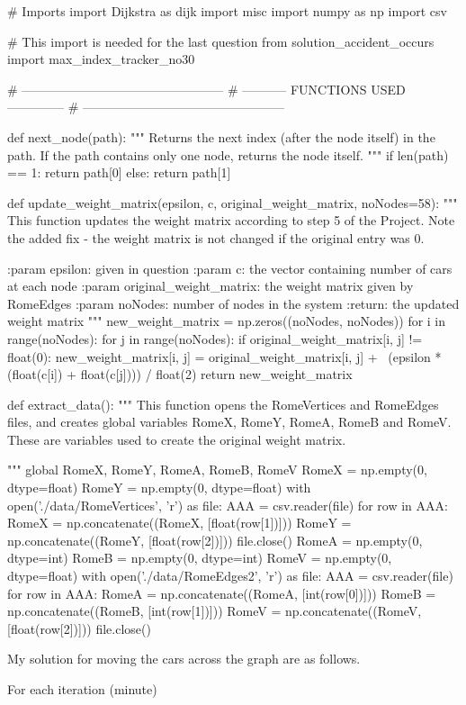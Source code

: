 \documentclass[paper=a4, fontsize=12pt]{scrartcl} %
\numberwithin{equation}{section}       %
\numberwithin{figure}{section}         %
\numberwithin{table}{section}          %
\begin{document}
\begin{python}
# Imports
import Dijkstra as dijk
import misc
import numpy as np
import csv

# This import is needed for the last question
from solution_accident_occurs import max_index_tracker_no30


# ------------------------------------------------
# -----------    FUNCTIONS USED     --------------
# ------------------------------------------------

def next_node(path):
    """ Returns the next index (after the node itself) in the path.
        If the path contains only one node, returns the node itself.
    """
    if len(path) == 1:
        return path[0]
    else:
        return path[1]


def update_weight_matrix(epsilon, c, original_weight_matrix, noNodes=58):
    """
    This function updates the weight matrix according to step 5 of the
    Project. Note the added fix - the weight matrix is not changed if
    the original entry was 0.



    :param epsilon: given in question
    :param c: the vector containing number of cars at each node
    :param original_weight_matrix: the weight matrix given by RomeEdges
    :param noNodes: number of nodes in the system
    :return: the updated weight matrix
    """
    new_weight_matrix = np.zeros((noNodes, noNodes))
    for i in range(noNodes):
        for j in range(noNodes):
            if original_weight_matrix[i, j] != float(0):
                new_weight_matrix[i, j] = original_weight_matrix[i, j] + \
                                          (epsilon * (float(c[i]) +
                                                      float(c[j]))) / float(2)
    return new_weight_matrix


def extract_data():
    """
    This function opens the RomeVertices and RomeEdges files, and creates
    global variables RomeX, RomeY, RomeA, RomeB and RomeV. These are variables
    used to create the original weight matrix.

    """
    global RomeX, RomeY, RomeA, RomeB, RomeV
    RomeX = np.empty(0, dtype=float)
    RomeY = np.empty(0, dtype=float)
    with open('./data/RomeVertices', 'r') as file:
        AAA = csv.reader(file)
        for row in AAA:
            RomeX = np.concatenate((RomeX, [float(row[1])]))
            RomeY = np.concatenate((RomeY, [float(row[2])]))
    file.close()
    RomeA = np.empty(0, dtype=int)
    RomeB = np.empty(0, dtype=int)
    RomeV = np.empty(0, dtype=float)
    with open('./data/RomeEdges2', 'r') as file:
        AAA = csv.reader(file)
        for row in AAA:
            RomeA = np.concatenate((RomeA, [int(row[0])]))
            RomeB = np.concatenate((RomeB, [int(row[1])]))
            RomeV = np.concatenate((RomeV, [float(row[2])]))
    file.close()

\end{python}

My solution for moving the cars across the graph are as follows.

For each iteration (minute)
\end{document}
